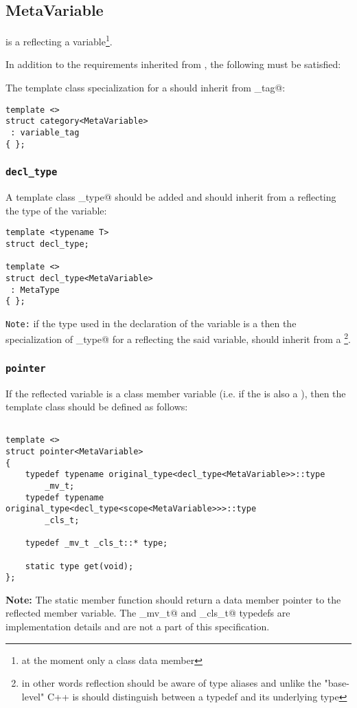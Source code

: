 \subsection{MetaVariable}
\label{concept-MetaVariable}

 is a  reflecting a variable\footnote{
at the moment only a class data member}.

In addition to the requirements inherited from , the following must
be satisfied:

The \verb@category@ template class specialization for a  should
inherit from \verb@variable_tag@:

\begin{verbatim}
template <>
struct category<MetaVariable>
 : variable_tag
{ };
\end{verbatim}

\subsubsection{\texttt{decl\_type}}

A template class \verb@decl_type@ should be added and should inherit
from a  reflecting the type of the variable:

\begin{verbatim}
template <typename T>
struct decl_type;

template <>
struct decl_type<MetaVariable>
 : MetaType
{ };
\end{verbatim}

\texttt{Note:} if the type used in the declaration of the variable
is a \verb@typedef@ then the specialization of \verb@decl_type@ for
a  reflecting the said variable, should
inherit from a \footnote{in other words reflection
should be aware of type aliases and unlike the "base-level" C++
is should distinguish between a typedef and its underlying type}.

\subsubsection{\texttt{pointer}}

If the reflected variable is a class member variable (i.e. if the 
is also a ), then the \verb@pointer@ template class should be
defined as follows:

\begin{verbatim}

template <>
struct pointer<MetaVariable>
{
	typedef typename original_type<decl_type<MetaVariable>>::type
		_mv_t;
	typedef typename original_type<decl_type<scope<MetaVariable>>>::type
		_cls_t;

	typedef _mv_t _cls_t::* type;

	static type get(void);
};

\end{verbatim}

\textbf{Note:} The static member function \verb@get@ should return a data member pointer to
the reflected member variable. The \verb@_mv_t@ and \verb@_cls_t@ typedefs
are implementation details and are not a part of this specification.
